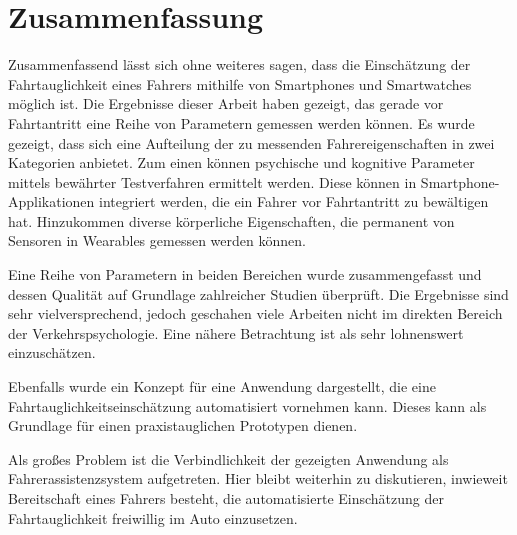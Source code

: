 \section{Zusammenfassung}
\label{conclusion}
Zusammenfassend lässt sich ohne weiteres sagen, dass die Einschätzung der Fahrtauglichkeit eines Fahrers mithilfe von Smartphones und Smartwatches möglich ist. Die Ergebnisse dieser Arbeit haben gezeigt, das gerade vor Fahrtantritt eine Reihe von Parametern gemessen werden können. Es wurde gezeigt, dass sich eine Aufteilung der zu messenden Fahrereigenschaften in zwei Kategorien anbietet. Zum einen können psychische und kognitive Parameter mittels bewährter Testverfahren ermittelt werden. Diese können in Smartphone-Applikationen integriert werden, die ein Fahrer vor Fahrtantritt zu bewältigen hat. Hinzukommen diverse körperliche Eigenschaften, die permanent von Sensoren in Wearables gemessen werden können.

Eine Reihe von Parametern in beiden Bereichen wurde zusammengefasst und dessen Qualität auf Grundlage zahlreicher Studien überprüft. Die Ergebnisse sind sehr vielversprechend, jedoch geschahen viele Arbeiten nicht im direkten Bereich der Verkehrspsychologie. Eine nähere Betrachtung ist als sehr lohnenswert einzuschätzen.

Ebenfalls wurde ein Konzept für eine Anwendung dargestellt, die eine Fahrtauglichkeitseinschätzung automatisiert vornehmen kann. Dieses kann als Grundlage für einen praxistauglichen Prototypen dienen.

Als großes Problem ist die Verbindlichkeit der gezeigten Anwendung als Fahrerassistenzsystem aufgetreten. Hier bleibt weiterhin zu diskutieren, inwieweit Bereitschaft eines Fahrers besteht, die automatisierte Einschätzung der Fahrtauglichkeit freiwillig im Auto einzusetzen.